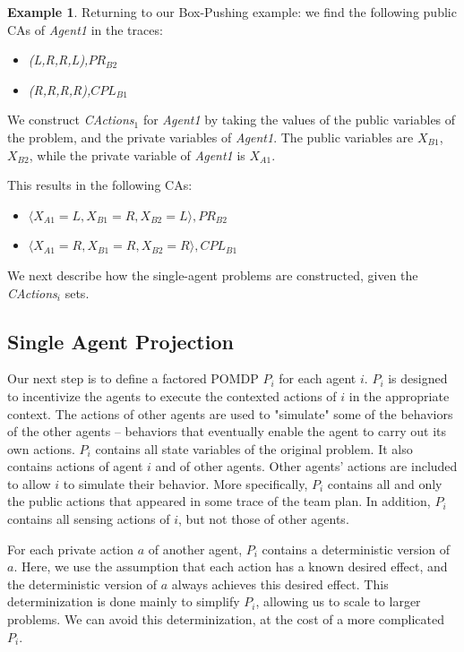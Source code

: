 \documentclass[letterpaper]{article} %
\theoremstyle{definition}
\newtheorem{example}{Example}
\newcommand{\cact}[1]{{\em CActions$_#1$}}
\begin{document}
\begin{example}
Returning to our Box-Pushing example: we find the following public CAs of \emph{Agent1} in the traces:
\begin{itemize}
    \item \emph{(L,R,R,L),$PR_{B2}$}
    \item \emph{(R,R,R,R),$CPL_{B1}$}
\end{itemize}


We construct \cact{1} for \emph{Agent1} by taking the values of the public variables of the problem, and the private variables of \emph{Agent1}. The public variables are $X_{B1}$, $X_{B2}$, while the private variable of \emph{Agent1} is $X_{A1}$. 

This results in the following CAs:
\begin{itemize}
    \item $\langle X_{A1}=L, X_{B1}=R, X_{B2}=L\rangle ,PR_{B2}$
    \item $\langle X_{A1}=R, X_{B1}=R, X_{B2}=R\rangle ,CPL_{B1}$
\end{itemize}
\end{example}

We next describe how the single-agent problems are constructed, given the \cact{i} sets.


\subsection{Single Agent Projection}


Our next step is to define a factored POMDP $P_i$ for each agent $i$. $P_i$ is designed to incentivize the agents to execute the contexted actions of $i$ in the appropriate context.
The actions of other agents are used to "simulate" some of the behaviors of the other agents -- behaviors that eventually enable the agent to carry out its own actions.
$P_i$ contains all state variables of the original problem. It also contains actions of agent $i$ and of other agents. Other agents' actions are included to allow $i$ to simulate their behavior. More specifically,
$P_i$ contains all and only 
the public actions that appeared in some trace of the team plan.
In addition, $P_i$ contains all sensing actions of $i$, but not those of
other agents. 

For each private action $a$ of another agent, $P_i$ contains a deterministic version of $a$. Here, we use the assumption that each action has a known desired effect, and the deterministic version of $a$ always achieves this desired effect. This determinization is done mainly to simplify $P_i$, allowing us to scale to larger problems. We can avoid this determinization, at the cost of a more complicated $P_i$.
\end{document}
